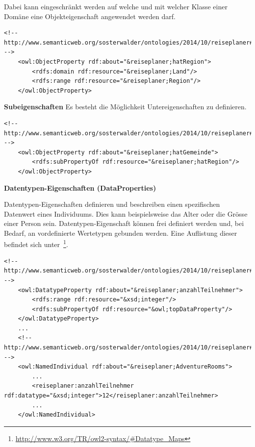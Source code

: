 Dabei kann eingeschränkt werden auf welche und mit welcher Klasse einer Domäne eine Objekteigenschaft angewendet werden darf.

\begin{lstlisting}[caption={Beispiel von Einschränkungen der Objekteigenschaft \textit{hatRegion}}]
    <!-- http://www.semanticweb.org/sosterwalder/ontologies/2014/10/reiseplaner#hatRegion -->
    <owl:ObjectProperty rdf:about="&reiseplaner;hatRegion">
        <rdfs:domain rdf:resource="&reiseplaner;Land"/>
        <rdfs:range rdf:resource="&reiseplaner;Region"/>
    </owl:ObjectProperty>
\end{lstlisting}

\textbf{Subeigenschaften}
Es besteht die Möglichkeit Untereigenschaften zu definieren.

\begin{lstlisting}[caption={Beispiel der Objekteigenschaft \textit{hatGemeinde} als Subeigenschaft von \textit{hatRegion}}]
    <!-- http://www.semanticweb.org/sosterwalder/ontologies/2014/10/reiseplaner#hatGemeinde -->
    <owl:ObjectProperty rdf:about="&reiseplaner;hatGemeinde">
        <rdfs:subPropertyOf rdf:resource="&reiseplaner;hatRegion"/>
    </owl:ObjectProperty>
\end{lstlisting}

\textbf{Datentypen-Eigenschaften (DataProperties)}

Datentypen-Eigenschaften definieren und beschreiben einen spezifischen Datenwert eines Individuums. Dies kann beispielsweise das Alter oder die Grösse einer Person sein. Datentypen-Eigenschaft können frei definiert werden und, bei Bedarf, an vordefinierte Wertetypen gebunden werden. Eine Auflistung dieser befindet sich unter~\footnote{\url{http://www.w3.org/TR/owl2-syntax/#Datatype_Maps}}.


\begin{lstlisting}[caption={Beispiel der Datentypen-Eigenschaft \textit{anzahlTeilnehmer} und deren Anwendung bei einem Individuum}]
    <!-- http://www.semanticweb.org/sosterwalder/ontologies/2014/10/reiseplaner#anzahlTeilnehmer -->
    <owl:DatatypeProperty rdf:about="&reiseplaner;anzahlTeilnehmer">
        <rdfs:range rdf:resource="&xsd;integer"/>
        <rdfs:subPropertyOf rdf:resource="&owl;topDataProperty"/>
    </owl:DatatypeProperty>
    ...
    <!-- http://www.semanticweb.org/sosterwalder/ontologies/2014/10/reiseplaner#AdventureRooms -->
    <owl:NamedIndividual rdf:about="&reiseplaner;AdventureRooms">
        ...
        <reiseplaner:anzahlTeilnehmer rdf:datatype="&xsd;integer">12</reiseplaner:anzahlTeilnehmer>
        ...
    </owl:NamedIndividual>
\end{lstlisting}

